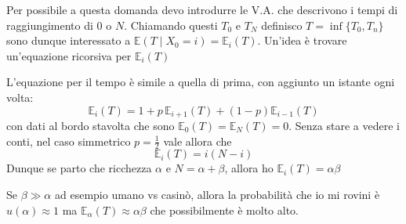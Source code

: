Per possibile a questa domanda devo introdurre le V.A. che descrivono i tempi di
raggiungimento di \(0\) o \(N\). Chiamando questi \(T_{0}\) e \(T_N\) definisco
\(T = \inf \{T_{0}, T_{n}\} \) sono dunque interessato a \(\mathbb{E}{(T \;|\;
X_{0} = i)} = \mathbb{E}_i{(T)}\). Un'idea è trovare un'equazione ricorsiva per
\(\mathbb{E}_i{(T)}\) 
\begin{center}
\end{center}

L'equazione per il tempo è simile a quella di prima, con aggiunto un istante
ogni volta:
\[
  \mathbb{E}_i{(T)} = 1 + p\, \mathbb{E}_{i+1} {(T)} + {(1-p)} \mathbb{E}_{i-1}
  {(T)}
\]
con dati al bordo stavolta che sono \(\mathbb{E}_0 {(T)} = \mathbb{E}_N{(T)} =
0\). Senza stare a vedere i conti, nel caso simmetrico \(p = \frac{1}{2}\) vale
allora che
\[
  \mathbb{E}_i{(T)} = i {(N-i)}
\]
Dunque se parto che ricchezza \(\alpha\) e \(N = \alpha + \beta\), allora ho
\(\mathbb{E}_i {(T)} = \alpha \beta\) 

\begin{remark}{}
    Se \(\beta \gg \alpha\) ad esempio umano vs casinò, allora la probabilità
    che io mi rovini è \(u{(\alpha)} \approx 1\) ma \(\mathbb{E}_{\alpha} {(T)}
    \approx \alpha\beta\) che possibilmente è molto alto.
\end{remark}

